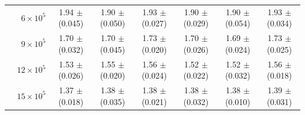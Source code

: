 \documentclass[10pt,journal,compsoc]{IEEEtran}
\begin{document}
\begin{table}
\begin{tabular}{c|r|c|c|c|c|c|c}
 & $6 \times 10^5 $  & 1.94 $\pm$ (0.045) & 1.90 $\pm$ (0.050) & 1.93 $\pm$ (0.027) & 1.90 $\pm$ (0.029) & 1.90 $\pm$ (0.054) & 1.93 $\pm$ (0.034)  \\
 & $9 \times 10^5 $  & 1.70 $\pm$ (0.032) & 1.70 $\pm$ (0.045) & 1.73 $\pm$ (0.020) & 1.70 $\pm$ (0.026) & 1.69 $\pm$ (0.024) & 1.73 $\pm$ (0.025)  \\
 & $12 \times 10^5 $ & 1.53 $\pm$ (0.026) & 1.55 $\pm$ (0.020) & 1.56 $\pm$ (0.024) & 1.52 $\pm$ (0.022) & 1.52 $\pm$ (0.032) & 1.56 $\pm$ (0.018)  \\
 & $15 \times 10^5 $ & 1.37 $\pm$ (0.018) & 1.38 $\pm$ (0.035) & 1.38 $\pm$ (0.021) & 1.38 $\pm$ (0.032) & 1.38 $\pm$ (0.010) & 1.39 $\pm$ (0.031) \\
\hline \hline
\end{tabular}
\vspace{-2ex}
\end{table}
\end{document}
